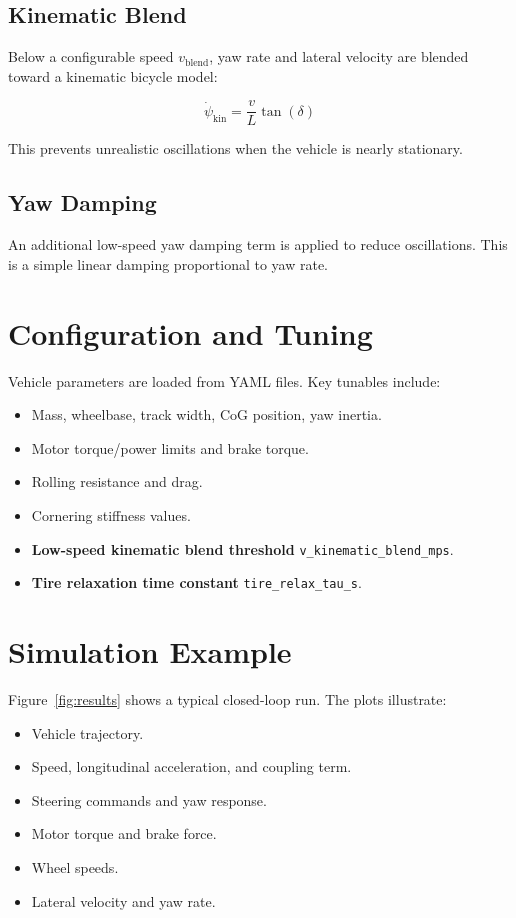 \documentclass[11pt]{article}
\begin{document}
\subsection{Kinematic Blend}
Below a configurable speed $v_{\text{blend}}$, yaw rate and lateral velocity are blended toward a kinematic bicycle model:

\begin{equation}
\dot{\psi}_{\text{kin}} = \frac{v}{L} \tan(\delta)
\end{equation}

This prevents unrealistic oscillations when the vehicle is nearly stationary.

\subsection{Yaw Damping}
An additional low-speed yaw damping term is applied to reduce oscillations. This is a simple linear damping proportional to yaw rate.

\section{Configuration and Tuning}
Vehicle parameters are loaded from YAML files. Key tunables include:

\begin{itemize}
\item Mass, wheelbase, track width, CoG position, yaw inertia.
\item Motor torque/power limits and brake torque.
\item Rolling resistance and drag.
\item Cornering stiffness values.
\item \textbf{Low-speed kinematic blend threshold} \texttt{v\_kinematic\_blend\_mps}.
\item \textbf{Tire relaxation time constant} \texttt{tire\_relax\_tau\_s}.
\end{itemize}

\section{Simulation Example}
Figure~\ref{fig:results} shows a typical closed-loop run. The plots illustrate:

\begin{itemize}
\item Vehicle trajectory.
\item Speed, longitudinal acceleration, and coupling term.
\item Steering commands and yaw response.
\item Motor torque and brake force.
\item Wheel speeds.
\item Lateral velocity and yaw rate.
\end{itemize}
\end{document}
